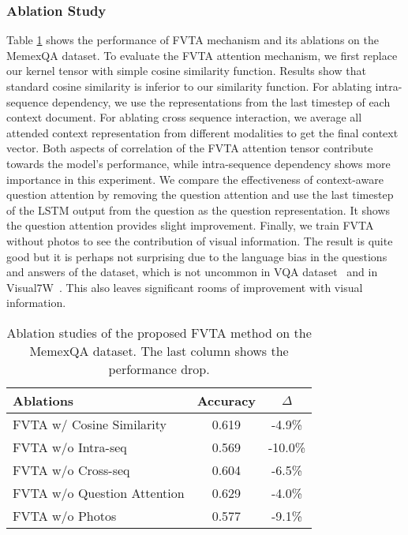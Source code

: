 \subsubsection{Ablation Study}
Table \ref{exp-mem-abla} shows the performance of FVTA mechanism and its ablations on the MemexQA dataset. 
To evaluate the FVTA attention mechanism, we first replace our kernel tensor with simple cosine similarity function. Results show that standard cosine similarity is inferior to our similarity function. 
For ablating intra-sequence dependency, we use the representations from the last timestep of each context document. For ablating cross sequence interaction, we average all attended context representation from different modalities to get the final context vector.
Both aspects of correlation of the FVTA attention tensor contribute towards the model's performance, while intra-sequence dependency shows more importance in this experiment. We compare the effectiveness of context-aware question attention by removing the question attention and use the last timestep of the LSTM output from the question as the question representation. It shows the question attention provides slight improvement. Finally, we train FVTA without photos to see the contribution of visual information. The result is quite good but it is perhaps not surprising due to the language bias in the questions and answers of the dataset, which is not uncommon in VQA dataset~\cite{antol2015vqa} and in Visual7W~\cite{zhu2016visual7w}. This also leaves significant rooms of improvement with visual information.

\begin{table}[ht]
\centering
\begin{tabular}{l||c|c}
\hline
Ablations      & Accuracy & $\Delta$ \\ \hline \hline
FVTA w/ Cosine Similarity  & 0.619 & -4.9\% \\
FVTA w/o Intra-seq  &0.569& -10.0\% \\
FVTA w/o Cross-seq  & 0.604& -6.5\%\\
FVTA w/o Question Attention 		&0.629 &-4.0\%\\ 
FVTA w/o Photos &	0.577& -9.1\%\\
\hline
\end{tabular}
\vspace{1mm}
\caption{Ablation studies of the proposed FVTA method on the MemexQA dataset. 
The last column shows the performance drop.}
\label{exp-mem-abla}
\end{table}




